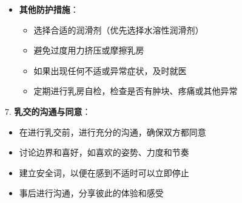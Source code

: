 \documentclass[12pt,UTF8]{ctexbook}
\begin{document}
\begin{itemize}
\begin{itemize}
\begin{itemize}
			\item 保持乳房和阴茎的清洁，使用温和的肥皂和水清洗
			\item 避免在乳房或阴茎有伤口、溃疡或炎症时进行乳交
			\item 如果乳头有破损，避免进行乳交，直到完全愈合
		\end{itemize}
		\item \textbf{其他防护措施}：
		\begin{itemize}
			\item 选择合适的润滑剂（优先选择水溶性润滑剂）
			\item 避免过度用力挤压或摩擦乳房
			\item 如果出现任何不适或异常症状，及时就医
			\item 定期进行乳房自检，检查是否有肿块、疼痛或其他异常
		\end{itemize}
	\end{itemize}
\end{itemize}

7. \textbf{乳交的沟通与同意}：
\begin{itemize}
	\item 在进行乳交前，进行充分的沟通，确保双方都同意
	\item 讨论边界和喜好，如喜欢的姿势、力度和节奏
	\item 建立安全词，以便在感到不适时可以立即停止
	\item 事后进行沟通，分享彼此的体验和感受
\end{itemize}
\end{document}
